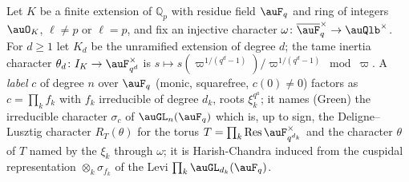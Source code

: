 \documentclass[10pt]{amsart}
\theoremstyle{definition}
\theoremstyle{remark}
\newcommand{\Q}{\mathbb Q}
\begin{document}
Let $K$ be a finite extension of $\Q_p$ with residue field $\auF_q$ and ring of integers $\auO_K$,
$\ell\ne p$ or $\ell=p$, and fix an injective character $\omega\colon\overline{\auF}_q^\times
\to\auQlb^\times$. For $d\ge1$ let $K_d$ be the unramified extension of degree $d$; the tame
inertia character $\theta_d\colon I_K\to\auF_{q^d}^\times$ is $s\mapsto s(\varpi^{1/(q^d-1)})/
\varpi^{1/(q^d-1)}\bmod\varpi$. A \emph{label} $c$ of degree $n$ over $\auF_q$ (monic, squarefree,
$c(0)\ne0$) factors as $c=\prod_kf_k$ with $f_k$ irreducible of degree $d_k$, roots $\xi_k^{q^a}$;
it names (Green) the irreducible character $\sigma_c$ of $\auGL_n(\auF_q)$ which is, up to sign,
the Deligne--Lusztig character $R_T(\theta)$ for the torus $T=\prod_k\operatorname{Res}\auF_{q^{
d_k}}^\times$ and the character $\theta$ of $T$ named by the $\xi_k$ through $\omega$; it is
Harish-Chandra induced from the cuspidal representation $\otimes_k\sigma_{f_k}$ of the Levi
$\prod_k\auGL_{d_k}(\auF_q)$.
\end{document}
